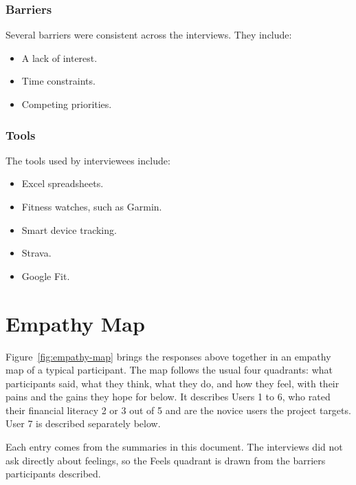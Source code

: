\documentclass[12pt]{article}
\begin{document}
\subsubsection{Barriers}
Several barriers were consistent across the interviews. They include:
\begin{itemize}
    \item A lack of interest.
    \item Time constraints.
    \item Competing priorities.
\end{itemize}

\subsubsection{Tools}
The tools used by interviewees include:
\begin{itemize}
    \item Excel spreadsheets.
    \item Fitness watches, such as Garmin.
    \item Smart device tracking.
    \item Strava.
    \item Google Fit.
\end{itemize}

\section{Empathy Map}

Figure~\ref{fig:empathy-map} brings the responses above together in an
empathy map of a typical participant. The map follows the usual four
quadrants: what participants said, what they think, what they do, and how
they feel, with their pains and the gains they hope for below. It describes
Users 1 to 6, who rated their financial literacy 2 or 3 out of 5 and are the
novice users the project targets. User 7 is described separately below.

Each entry comes from the summaries in this document. The interviews did not
ask directly about feelings, so the Feels quadrant is drawn from the barriers
participants described.
\end{document}
